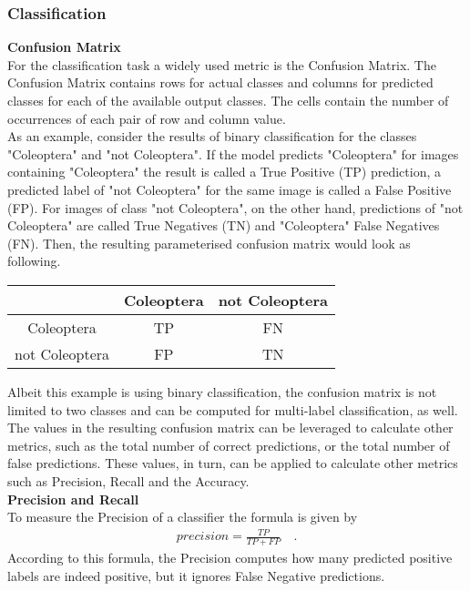 \subsubsection{Classification}
\textbf{Confusion Matrix}\\
For the classification task a widely used metric is the Confusion Matrix.
The Confusion Matrix contains rows for actual classes and columns for predicted classes for each of the available output classes.
The cells contain the number of occurrences of each pair of row and column value.\\
As an example, consider the results of binary classification for the classes "Cole\-optera" and "not Cole\-optera".
If the model predicts "Cole\-optera" for images containing "Cole\-optera" the result is called a True Positive (TP) prediction, a predicted label of "not Cole\-optera" for the same image is called a False Positive (FP).
For images of class "not Cole\-optera", on the other hand, predictions of "not Cole\-optera" are called True Negatives (TN) and "Coleoptera" False Negatives (FN). Then, the resulting parameterised confusion matrix would look as following.
\begin{center}
    \begin{tabular}{|c|c|c|}
        \hline
        & Coleoptera & not Coleoptera \\
        \hline
        Coleoptera     & TP          & FN              \\
        \hline
        not Coleoptera & FP          & TN              \\
        \hline
    \end{tabular}
\end{center}
Albeit this example is using binary classification, the confusion matrix is not limited to two classes and can be computed for multi-label classification, as well.\\
The values in the resulting confusion matrix can be leveraged to calculate other metrics, such as the total number of correct predictions, or the total number of false predictions.
These values, in turn, can be applied to calculate other metrics such as Precision, Recall and the Accuracy.\\
\textbf{Precision and Recall}\\
To measure the Precision of a classifier the formula is given by
\begin{align}
    precision = \frac{TP}{TP+FP}\quad.
    \label{eq:precision}
\end{align}
According to this formula, the Precision computes how many predicted positive labels are indeed positive, but it ignores False Negative predictions.
